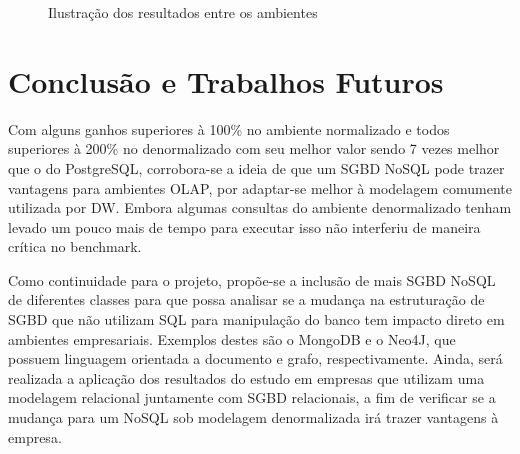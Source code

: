 \documentclass[12pt]{article}
\begin{document}
\begin{figure}[htpb]
    \centering
    \caption{Ilustração dos resultados entre os ambientes}\label{fig:qph_ambiente}
\end{figure}

\section{Conclusão e Trabalhos Futuros}

Com alguns ganhos superiores à 100\% no ambiente normalizado e todos superiores à 
200\% no denormalizado com seu melhor valor sendo 7 vezes melhor que o do PostgreSQL, 
corrobora-se a ideia de que um SGBD NoSQL pode trazer vantagens para ambientes OLAP, 
por adaptar-se melhor à modelagem comumente utilizada por DW. Embora algumas consultas 
do ambiente denormalizado tenham levado um pouco mais de tempo para executar isso não 
interferiu de maneira crítica no benchmark.

Como continuidade para o projeto, propõe-se a inclusão de mais SGBD NoSQL de 
diferentes classes para que possa analisar se a mudança na estruturação de SGBD 
que não utilizam SQL para manipulação do banco tem impacto direto em ambientes empresariais. 
Exemplos destes são o MongoDB e o Neo4J, que possuem linguagem orientada a documento e 
grafo, respectivamente. Ainda, será realizada a aplicação dos resultados do estudo em 
empresas que utilizam uma modelagem relacional juntamente com SGBD relacionais, a fim 
de verificar se a mudança para um NoSQL sob modelagem denormalizada irá trazer 
vantagens à empresa.



\end{document}
